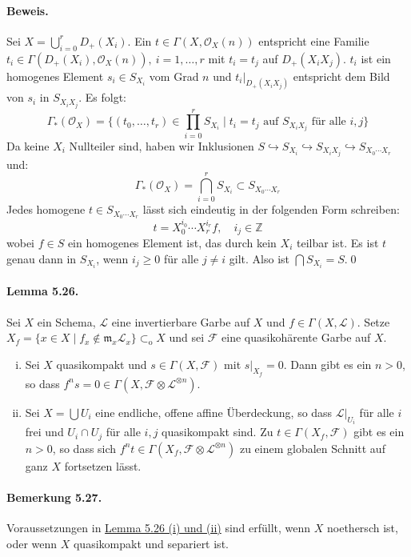 \paragraph{Beweis.} Sei $X=\bigcup_{i=0}^r D_+(X_i)$. Ein $t\in\Gamma(X,\mathcal{O}_X(n))$ entspricht eine Familie $t_i\in\Gamma(D_+(X_i),\mathcal{O}_X(n)),\ i=1,\ldots,r$ mit $t_i=t_j$ auf $D_+(X_iX_j)$. $t_i$ ist ein homogenes Element $s_i\in S_{X_i}$ vom Grad $n$ und $t_i|_{D_+(X_iX_j)}$ entspricht dem Bild von $s_i$ in $S_{X_iX_j}$. Es folgt:
\[\Gamma_\ast(\mathcal{O}_X)=\Big\{ (t_0,\ldots,t_r)\in\prod_{i=0}^r S_{X_i}\mid t_i=t_j\text{ auf } S_{X_iX_j}\text{ für alle }i,j \Big\} \]
Da keine $X_i$ Nullteiler sind, haben wir Inklusionen $S\hookrightarrow S_{X_i}\hookrightarrow S_{X_iX_j}\hookrightarrow S_{X_0\cdots X_r}$ und:
\[\Gamma_\ast(\mathcal{O}_X)=\bigcap_{i=0}^r S_{X_i}\subset S_{X_0\cdots X_r} \]
Jedes homogene $t\in S_{X_0\cdots X_r}$ lässt sich eindeutig in der folgenden Form schreiben:
\[t=X_0^{i_0}\cdots X_r^{i_r}f,\quad i_j\in\mathbb{Z}\]
wobei $f\in S$ ein homogenes Element ist, das durch kein $X_i$ teilbar ist. Es ist $t$ genau dann in $S_{X_i}$, wenn $i_j\geq 0$ für alle $j\neq i$ gilt. Also ist $\bigcap S_{X_i}=S$.\qed

\paragraph{Lemma 5.26.}\label{5.26} Sei $X$ ein Schema, $\mathcal{L}$ eine invertierbare Garbe auf $X$ und $f\in\Gamma(X,\mathcal{L})$. Setze $X_f=\{x\in X\mid f_x\not\in\mathfrak{m}_x\mathcal{L}_x\}\subset_\text{o}X$ und sei $\mathcal{F}$ eine quasikohärente Garbe auf $X$.
\begin{enumerate}[(i)]
\item Sei $X$ quasikompakt und $s\in\Gamma(X,\mathcal{F})$ mit $s|_{X_f}=0$. Dann gibt es ein $n>0$, so dass $f^ns=0\in\Gamma(X,\mathcal{F}\otimes\mathcal{L}^{\otimes n})$.
\item Sei $X=\bigcup U_i$ eine endliche, offene affine Überdeckung, so dass $\mathcal{L}|_{U_i}$ für alle $i$ frei und $U_i\cap U_j$ für alle $i,j$ quasikompakt sind. Zu $t\in\Gamma(X_f,\mathcal{F})$ gibt es ein $n>0$, so dass sich $f^nt\in\Gamma(X_f,\mathcal{F}\otimes\mathcal{L}^{\otimes n})$ zu einem globalen Schnitt auf ganz $X$ fortsetzen lässt.
\end{enumerate}

\paragraph{Bemerkung 5.27.}\label{5.27} Voraussetzungen in \hyperref[5.26]{Lemma 5.26 (i) und (ii)} sind erfüllt, wenn $X$ noethersch ist, oder wenn $X$ quasikompakt und separiert ist.

